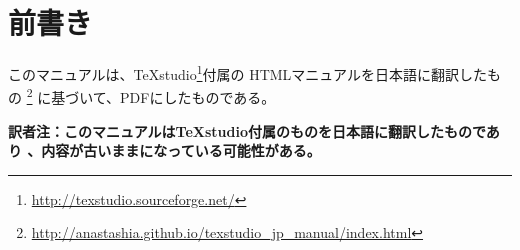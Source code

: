 \chapter{前書き}
このマニュアルは、TeXstudio\footnote{\url{http://texstudio.sourceforge.net/}}付属の
HTMLマニュアルを日本語に翻訳したもの
\footnote{\url{http://anastashia.github.io/texstudio_jp_manual/index.html}}
に基づいて、PDFにしたものである。

\textbf{訳者注：このマニュアルはTeXstudio付属のものを日本語に翻訳したものであり
、内容が古いままになっている可能性がある。}

